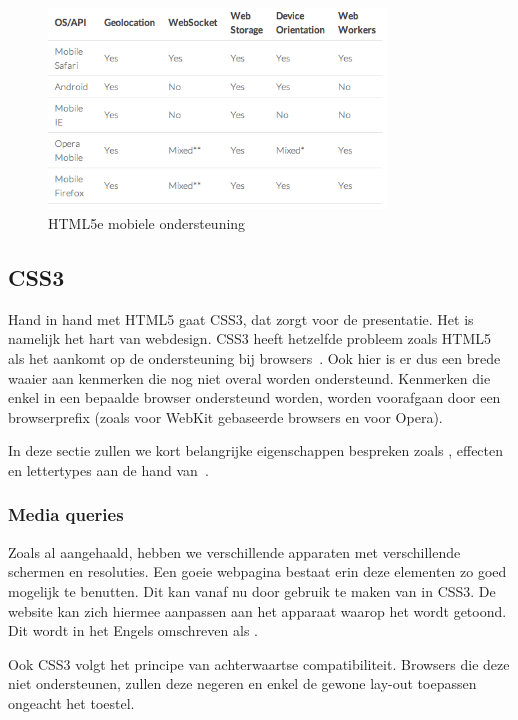 \begin{figure}
  \centering
  \includegraphics[width=0.8\textwidth]{figuren/html5e}
  \caption{HTML5e mobiele ondersteuning~\cite{Hales2012}}
  \label{fig:html5e}
\end{figure}

\subsection{CSS3}
\label{ref:css3}
Hand in hand met HTML5 gaat CSS3, dat zorgt voor de presentatie. 
Het is namelijk het hart van webdesign. 
CSS3 heeft hetzelfde probleem zoals HTML5 als het aankomt op de ondersteuning bij browsers~\cite{MacDonald2011}. 
Ook hier is er dus een brede waaier aan kenmerken die nog niet overal worden ondersteund. 
Kenmerken die enkel in een bepaalde browser ondersteund worden, worden voorafgaan door een browserprefix (zoals  voor WebKit gebaseerde browsers en  voor Opera).

In deze sectie zullen we kort belangrijke eigenschappen bespreken zoals , effecten en lettertypes aan de hand van~\cite{MacDonald2011}.

\subsubsection{Media queries}
Zoals al aangehaald, hebben we verschillende apparaten met verschillende schermen en resoluties. 
Een goeie webpagina bestaat erin deze elementen zo goed mogelijk te benutten. 
Dit kan vanaf nu door gebruik te maken van  in CSS3. 
De website kan zich hiermee aanpassen aan het apparaat waarop het wordt getoond. 
Dit wordt in het Engels omschreven als .

Ook CSS3 volgt het principe van achterwaartse compatibiliteit. 
Browsers die deze  niet ondersteunen, zullen deze negeren en enkel de gewone lay-out toepassen ongeacht het toestel.

